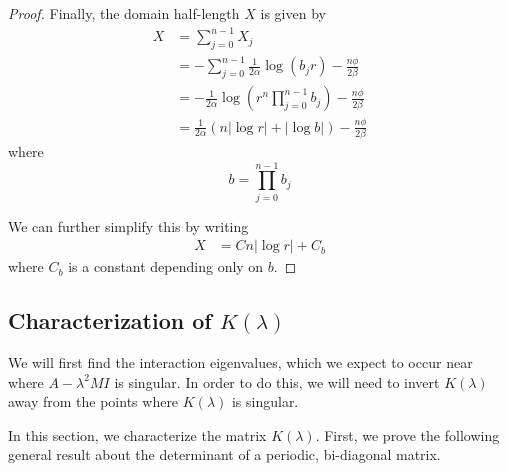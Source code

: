 \documentclass[thesis.tex]{subfiles}
\begin{document}
\begin{lemma}
\begin{proof}
Finally, the domain half-length $X$ is given by
\begin{align*}
X &= \sum_{j=0}^{n-1} X_j \\
&= -\sum_{j=0}^{n-1} \frac{1}{2\alpha}\log(b_j r) - \frac{n \phi}{2 \beta}\\
&= -\frac{1}{2\alpha} \log\left( r^n \prod_{j=0}^{n-1} b_j \right) - \frac{n \phi}{2 \beta} \\
&= \frac{1}{2\alpha} (n |\log r| + |\log b| ) - \frac{n \phi}{2 \beta}
\end{align*}
where 
\[
b = \prod_{j=0}^{n-1} b_j
\]

We can further simplify this by writing
\begin{align*}
X &= C n |\log r| + C_b
\end{align*}
where $C_b$ is a constant depending only on $b$.
\end{proof}
\end{lemma}

\subsection{Characterization of \texorpdfstring{$K(\lambda)$}{K} }

We will first find the interaction eigenvalues, which we expect to occur near where $A - \lambda^2 M I$ is singular. In order to do this, we will need to invert $K(\lambda)$ away from the points where $K(\lambda)$ is singular.

In this section, we characterize the matrix $K(\lambda)$. First, we prove the following general result about the determinant of a periodic, bi-diagonal matrix.
\end{document}
